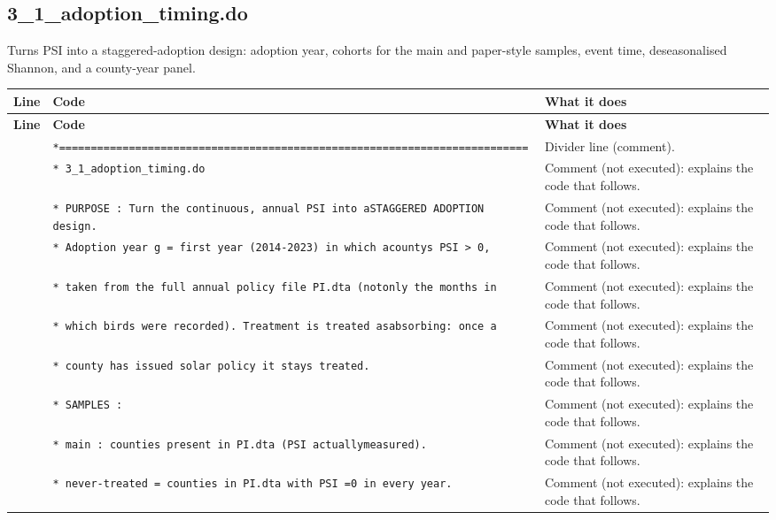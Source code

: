 \documentclass[10pt]{article}
\newcommand{\codetable}[1]{%
{\footnotesize
\begin{longtable}{>{\raggedleft\arraybackslash}p{0.55cm}>{\raggedright\arraybackslash}p{8.3cm}>{\raggedright\arraybackslash}p{8.0cm}}
\toprule \textbf{Line} & \textbf{Code} & \textbf{What it does}\\ \midrule \endfirsthead
\toprule \textbf{Line} & \textbf{Code} & \textbf{What it does}\\ \midrule \endhead
\bottomrule \endfoot
#1
\end{longtable}}}
\begin{document}
\subsection{3\_1\_adoption\_timing.do}
Turns PSI into a staggered-adoption design: adoption year, cohorts for the main and paper-style samples, event time, deseasonalised Shannon, and a county-year panel.

\codetable{1 & \texttt{*=========================================================\newline \hspace*{1em}=================} & Divider line (comment).\\
2 & \texttt{* 3\_1\_adoption\_timing.do} & Comment (not executed): explains the code that follows.\\
3 & \texttt{* PURPOSE : Turn the continuous, annual PSI into a\newline \hspace*{1em}STAGGERED ADOPTION design.} & Comment (not executed): explains the code that follows.\\
4 & \texttt{*   Adoption year g = first year (2014-{}2023) in which a\newline \hspace*{1em}county\textquotesingle{}s PSI > 0,} & Comment (not executed): explains the code that follows.\\
5 & \texttt{*   taken from the full annual policy file PI.dta (not\newline \hspace*{1em}only the months in} & Comment (not executed): explains the code that follows.\\
6 & \texttt{*   which birds were recorded). Treatment is treated as\newline \hspace*{1em}absorbing: once a} & Comment (not executed): explains the code that follows.\\
7 & \texttt{*   county has issued solar policy it stays \textquotedbl{}treated\textquotedbl{}.} & Comment (not executed): explains the code that follows.\\
8 & \texttt{* SAMPLES :} & Comment (not executed): explains the code that follows.\\
9 & \texttt{*   main  : counties present in PI.dta (PSI actually\newline \hspace*{1em}measured).} & Comment (not executed): explains the code that follows.\\
10 & \texttt{*           never-{}treated = counties in PI.dta with PSI =\newline \hspace*{1em}0 in every year.} & Comment (not executed): explains the code that follows.\\
}
\end{document}
